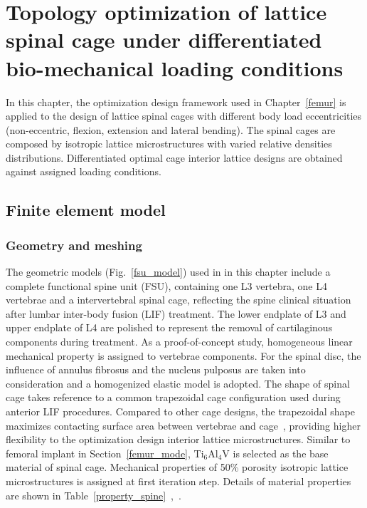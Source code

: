 \documentclass[12pt]{extbook}
\begin{document}


\chapter{Topology optimization of lattice spinal cage under differentiated bio-mechanical loading conditions}
\label{spine}

In this chapter, the optimization design framework used in Chapter~\ref{femur} is applied to the design of lattice spinal cages with different body load eccentricities (non-eccentric, flexion, extension and lateral bending). 
The spinal cages are composed by isotropic lattice microstructures with varied relative densities distributions. Differentiated optimal cage interior lattice designs are obtained against assigned loading conditions.\\

\section{Finite element model}
\label{spine_mode}

\subsection{Geometry and meshing}

The geometric models (Fig.~\ref{fsu_model}) used in in this chapter include a complete functional spine unit (FSU), containing one L3 vertebra, one L4 vertebrae and a intervertebral spinal cage, reflecting the spine clinical situation after lumbar inter-body fusion (LIF) treatment. The lower endplate of L3 and upper endplate of L4 are polished to represent the removal of cartilaginous components during treatment\cite{latif2022vertebral}. As a proof-of-concept study, homogeneous linear mechanical property is assigned to vertebrae components. For the spinal disc, the influence of annulus fibrosus and the nucleus pulposus are taken into consideration and a homogenized elastic model is adopted. The shape of spinal cage takes reference to a common trapezoidal cage configuration used during anterior LIF procedures. Compared to other cage designs, the trapezoidal shape maximizes contacting surface area between vertebrae and cage~\cite{yoo2019interbody}, providing higher flexibility to the optimization design interior lattice microstructures. Similar to femoral implant in Section~\ref{femur_mode}, $\text{Ti}_6\text{Al}_4\text{V}$ is selected as the base material of spinal cage. Mechanical properties of 50\% porosity isotropic lattice microstructures is assigned at first iteration step. Details of material properties are shown in Table~\ref{property_spine}~\cite{lu2013strain},~\cite{perie2005confined}.\\
\end{document}
